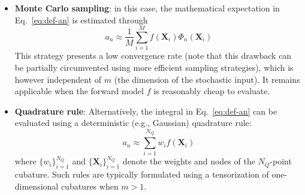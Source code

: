 \documentclass[preprint,review,12pt]{elsarticle}
\begin{document}
\begin{itemize}
    \item \textbf{Monte Carlo sampling}: in this case, the mathematical expectation in Eq.~\eqref{eq:def-an} is estimated through 
    \begin{equation}
        a_n \approx \frac{1}{M} \sum_{i = 1}^M f(\mathbf{X}_i) \Phi_n(\mathbf{X}_i)
    \end{equation}
    This strategy presents a low convergence rate (note that this drawback can be partially circumvented using more efficient sampling strategies), which is however independent of $m$ (the dimension of the stochastic input). It remains applicable when the forward model $f$ is reasonably cheap to evaluate. 
    

    \item \textbf{Quadrature rule}:
    Alternatively, the integral in Eq.~\eqref{eq:def-an} can be evaluated using a deterministic (e.g., Gaussian) quadrature rule:
    \begin{equation}
        a_n \approx \sum_{i=1}^{N_Q} w_i f(\mathbf{X}_i)
    \end{equation}
    where $\{w_i\}_{i = 1}^{N_Q}$ and $\{\mathbf{X}_i\}_{i = 1}^{N_Q}$ denote the weights and nodes of the $N_Q$-point cubature. Such rules are typically formulated using a tensorization of one-dimensional cubatures when $m >1$.    
    

\end{itemize}
\end{document}
